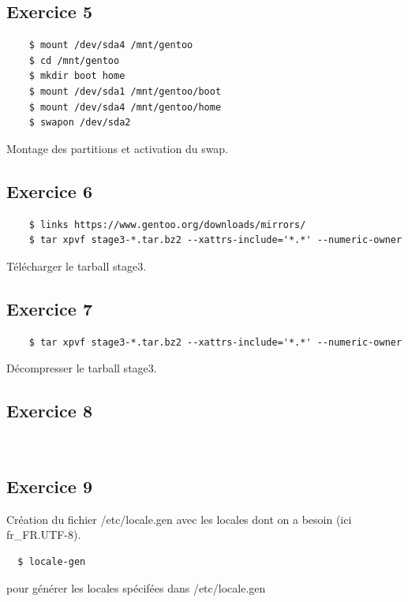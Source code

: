 \documentclass{report}
\begin{document}
\subsection{Exercice 5}
\begin{tcolorbox}
  \begin{verbatim}
    $ mount /dev/sda4 /mnt/gentoo
    $ cd /mnt/gentoo
    $ mkdir boot home
    $ mount /dev/sda1 /mnt/gentoo/boot
    $ mount /dev/sda4 /mnt/gentoo/home
    $ swapon /dev/sda2
  \end{verbatim}
\end{tcolorbox}
Montage des partitions et activation du swap.

\subsection{Exercice 6}
\begin{tcolorbox}
  \begin{verbatim}
    $ links https://www.gentoo.org/downloads/mirrors/
    $ tar xpvf stage3-*.tar.bz2 --xattrs-include='*.*' --numeric-owner
  \end{verbatim}
\end{tcolorbox}
Télécharger le tarball stage3.

\subsection{Exercice 7}
\begin{tcolorbox}
  \begin{verbatim}
    $ tar xpvf stage3-*.tar.bz2 --xattrs-include='*.*' --numeric-owner
  \end{verbatim}
\end{tcolorbox}
Décompresser le tarball stage3.

\subsection{Exercice 8}
\begin{tcolorbox}
  \begin{verbatim}
    
  \end{verbatim}
\end{tcolorbox}
\subsection{Exercice 9}
Création du fichier /etc/locale.gen avec les locales dont on a besoin (ici fr\_FR.UTF-8).
\begin{tcolorbox}
  \begin{verbatim}
  $ locale-gen
  \end{verbatim}
\end{tcolorbox}
pour générer les locales spécifées dans /etc/locale.gen
\end{document}
